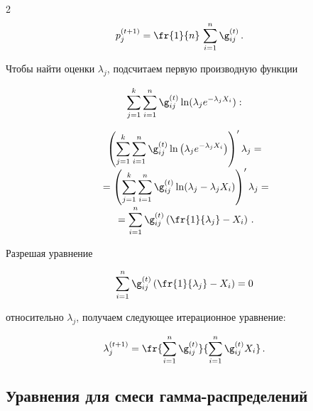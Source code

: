 \begin{multicols}{2}
\begin{align*}
p_j^{(t+1)} & = \fr{1}{n}\,\sum\limits_{i=1}^n \g_{ij}^{(t)}\,.


\end{align*}





Чтобы найти  оценки $\lambda_j$, подсчитаем первую производную функции


$$\sum_{j=1}^k\sum_{i=1}^n \g_{ij}^{(t)} \ln (\lambda_j e^{-\lambda_j X_i}):$$


\vspace*{-8pt}


\begin{multline*}


\left ( \sum\limits_{j=1}^k \sum\limits_{i=1}^n


\g_{ij}^{(t)}\ln \left ( \lambda_j


e^{-\lambda_j X_i} \right ) \right )^\prime \lambda_j =\\[-3pt]


{}= \left (


\sum\limits_{j=1}^k\sum\limits_{i=1}^n \g_{ij}^{(t)}\ln (\lambda_j -\lambda_j X_i )


\right )^\prime \lambda_j =\\[-3pt]


{}= \sum\limits_{i=1}^n \g_{ij}^{(t)}\left (


\fr{1}{\lambda_j} - X_i \right )\,.


\end{multline*}





Разрешая уравнение


$$


\sum\limits_{i=1}^n \g_{ij}^{(t)}\left ( \fr{1}{\lambda_j} -X_i\right ) =0


$$


относительно $\lambda_j$, получаем следующее итерационное уравнение:


$$


\lambda_j^{(t+1)} = \fr{\sum\limits_{i=1}^n


\g_{ij}^{(t)}}{\sum\limits_{i=1}^n \g_{ij}^{(t)} X_i}\,.


$$





\subsection{Уравнения для смеси гамма-распределений } %






\end{multicols}
